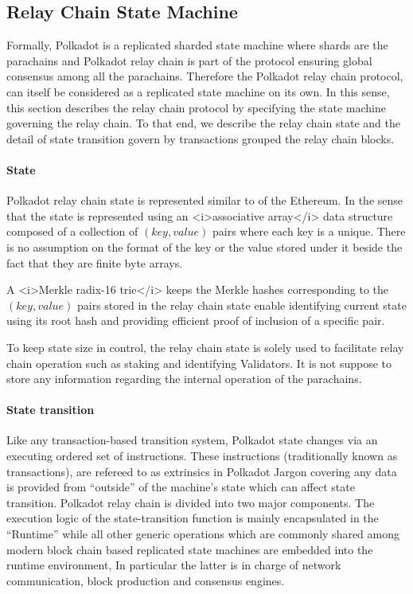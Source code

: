\subsection{Relay Chain State Machine}\label{sec:relaychain}

Formally, Polkadot is a replicated sharded state machine where shards are the parachains and Polkadot relay chain is part of the protocol ensuring global consensus among all the parachains. Therefore the Polkadot relay chain protocol, can itself be considered as a replicated state machine on its own. In this sense, this section describes the relay chain protocol by specifying the state machine governing the relay chain. To that end, we describe the relay chain state and the detail of state transition govern by transactions grouped the relay chain blocks.

\paragraph{State}
Polkadot relay chain state is represented similar to of the Ethereum. In the sense that the state is represented using an <i>associative array</i> data structure composed of a collection of $(key, value)$ pairs where each key is a unique. There is no assumption on the format of the key or the value stored under it beside the fact that they are finite byte arrays.

A <i>Merkle radix-16 trie</i> keeps the Merkle hashes corresponding to the $(key, value)$ pairs stored in the relay chain state enable identifying current state using its root hash and providing efficient proof of inclusion of a specific pair.

To keep state size in control, the relay chain state is solely used to facilitate relay chain operation such as staking and identifying Validators. It is not suppose to store any information regarding the internal operation of the parachains.

\paragraph{State transition}
Like any transaction-based transition system, Polkadot state changes via an executing ordered set of instructions. These instructions (traditionally known as transactions), are refereed to as extrinsics in Polkadot Jargon covering any data is provided from ``outside'' of the machine's state which can affect state transition. Polkadot relay chain is divided into two major components. The execution logic of the state-transition function is mainly encapsulated in the ``Runtime'' while all other generic operations which are commonly shared among modern block chain based replicated state machines are embedded into the runtime environment, In particular the latter is in charge of network communication, block production and consensus engines.

